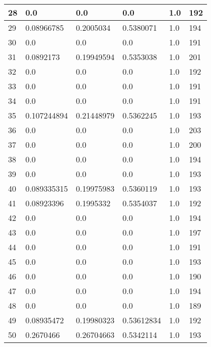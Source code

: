 \begin{longtable}{|l|l|l|l|l|l|}
28 & 0.0 & 0.0 & 0.0 & 1.0 & 192 \\ \hline 
29 & 0.08966785 & 0.2005034 & 0.5380071 & 1.0 & 194 \\ \hline 
30 & 0.0 & 0.0 & 0.0 & 1.0 & 191 \\ \hline 
31 & 0.0892173 & 0.19949594 & 0.5353038 & 1.0 & 201 \\ \hline 
32 & 0.0 & 0.0 & 0.0 & 1.0 & 192 \\ \hline 
33 & 0.0 & 0.0 & 0.0 & 1.0 & 191 \\ \hline 
34 & 0.0 & 0.0 & 0.0 & 1.0 & 191 \\ \hline 
35 & 0.107244894 & 0.21448979 & 0.5362245 & 1.0 & 193 \\ \hline 
36 & 0.0 & 0.0 & 0.0 & 1.0 & 203 \\ \hline 
37 & 0.0 & 0.0 & 0.0 & 1.0 & 200 \\ \hline 
38 & 0.0 & 0.0 & 0.0 & 1.0 & 194 \\ \hline 
39 & 0.0 & 0.0 & 0.0 & 1.0 & 193 \\ \hline 
40 & 0.089335315 & 0.19975983 & 0.5360119 & 1.0 & 193 \\ \hline 
41 & 0.08923396 & 0.1995332 & 0.5354037 & 1.0 & 192 \\ \hline 
42 & 0.0 & 0.0 & 0.0 & 1.0 & 194 \\ \hline 
43 & 0.0 & 0.0 & 0.0 & 1.0 & 197 \\ \hline 
44 & 0.0 & 0.0 & 0.0 & 1.0 & 191 \\ \hline 
45 & 0.0 & 0.0 & 0.0 & 1.0 & 193 \\ \hline 
46 & 0.0 & 0.0 & 0.0 & 1.0 & 190 \\ \hline 
47 & 0.0 & 0.0 & 0.0 & 1.0 & 194 \\ \hline 
48 & 0.0 & 0.0 & 0.0 & 1.0 & 189 \\ \hline 
49 & 0.08935472 & 0.19980323 & 0.53612834 & 1.0 & 192 \\ \hline 
50 & 0.2670466 & 0.26704663 & 0.5342114 & 1.0 & 193 \\ \hline 
\end{longtable}